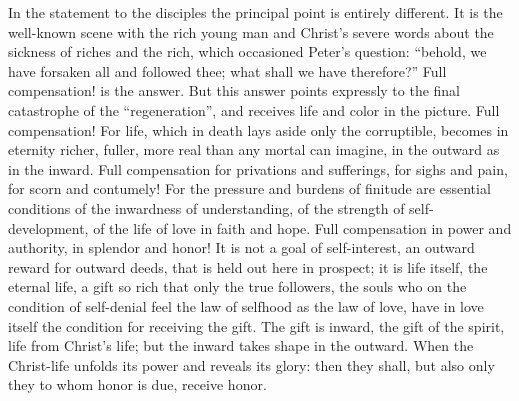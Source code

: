 \documentclass[12pt,a4paper,openany]{book}
\newcommand{\opage}[1]{\marginnote{\footnotesize\textit{[#1]}}}
\begin{document}
In the statement to the disciples the principal point is entirely
different.  It is the well-known scene with the rich young man
and Christ's severe words about the sickness of riches and the rich, which
occasioned Peter's question: ``behold, we have forsaken
all and followed thee; what shall we have therefore?''
Full compensation! is the answer.  But this answer points
expressly to the final catastrophe of the ``regeneration'', and
receives life and color in the picture.  Full compensation! For
life, which in death lays aside only the corruptible, becomes
in eternity richer, fuller, more real than any
mortal can imagine, in the outward as in the inward.
Full compensation for privations and sufferings, for sighs
and pain, for scorn and contumely!  For the pressure and
burdens of finitude are essential conditions of the inwardness of understanding,
of the strength of self-development, of the life of love in
\setcounter{footnote}{0}%
\opage{221}faith and hope.  Full compensation in power and authority, in
splendor and honor!  It is not a goal of self-interest, an
outward reward for outward deeds, that is held out here
in prospect; it is life itself, the eternal life, a gift so
rich that only the true followers, the souls who on
the condition of self-denial feel the law of selfhood as the law of love,
have in love itself the condition for
receiving the gift.  The gift is inward, the gift of the spirit,
life from Christ's life; but the inward takes shape in
the outward.  When the Christ-life unfolds its power and
reveals its glory: then they shall, but also only
they to whom honor is due, receive honor.
\end{document}
